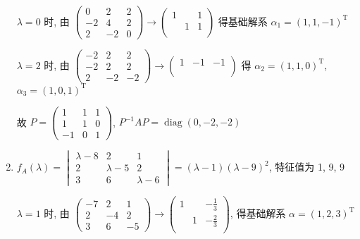 \begin{enumerate}
			       \( \lambda = 0 \) 时, 由 \( \begin{pmatrix}
				       0  & 2  & 2 \\
				       -2 & 4  & 2 \\
				       2  & -2 & 0
			       \end{pmatrix} \rightarrow \begin{pmatrix}
				       1 &   & 1 \\
				         & 1 & 1 \\
				         &   &
			       \end{pmatrix} \) 得基础解系 \( \alpha_{1} = (1, 1, -1)^{\mathrm{T}} \)

			       \( \lambda = 2 \) 时, 由 \( \begin{pmatrix}
				       -2 & 2  & 2  \\
				       -2 & 2  & 2  \\
				       2  & -2 & -2
			       \end{pmatrix} \rightarrow \begin{pmatrix}
				       1 & -1 & -1 \\
				         &    &    \\
				         &    &
			       \end{pmatrix} \) 得 \( \alpha_{2} = (1, 1, 0)^{\mathrm{T}} \), \( \alpha_{3} = (1, 0, 1)^{\mathrm{T}} \)

			       故 \( P = \begin{pmatrix}
				       1  & 1 & 1 \\
				       1  & 1 & 0 \\
				       -1 & 0 & 1
			       \end{pmatrix} \), \( P^{-1}AP = \operatorname{diag}(0, -2, -2) \)
			 \item %
			       \(f_{A}(\lambda)=
			       \begin{vmatrix}
				       \lambda-8 & 2         & 1         \\
				       2         & \lambda-5 & 2         \\
				       3         & 6         & \lambda-6
			       \end{vmatrix}
			       = (\lambda-1)(\lambda-9)^{2}\), 特征值为 1, 9, 9

			       \(\lambda = 1\) 时, 由 \(
			       \begin{pmatrix}
				       -7 & 2  & 1  \\
				       2  & -4 & 2  \\
				       3  & 6  & -5
			       \end{pmatrix}\to \begin{pmatrix}
				       1 &   & -\frac{1}{3} \\
				         & 1 & -\frac{2}{3} \\
				         &   &
			       \end{pmatrix} \), 得基础解系 \(\alpha=(1,2,3)^{\mathrm{T}}\)


\end{enumerate}
